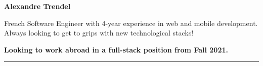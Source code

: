 \documentclass{cv}
\begin{document}
\pagestyle{empty}

\noindent\begin{minipage}[c]{\textwidth}
	\large

	\textbf{\Large\color{solviolet} Alexandre Trendel}

	\smallskip

	French Software Engineer with 4-year experience in web and mobile development. Always looking to get to grips with new technological stacks!

	\smallskip

	\textbf{Looking to work abroad in a full-stack position from Fall 2021.}

	\color{solviolet}\rule{3cm}{1pt}

\end{minipage}

\vspace{3ex}
\end{document}
